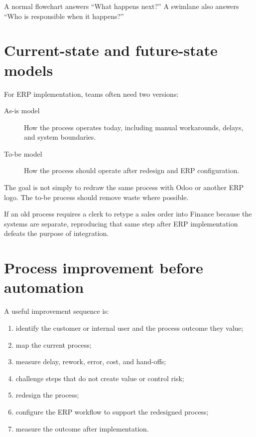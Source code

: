A normal flowchart answers ``What happens next?'' A swimlane also answers ``Who is responsible when it happens?''

\section{Current-state and future-state models}

For ERP implementation, teams often need two versions:

\begin{description}
  \item[As-is model] How the process operates today, including manual workarounds, delays, and system boundaries.
  \item[To-be model] How the process should operate after redesign and ERP configuration.
\end{description}

The goal is not simply to redraw the same process with Odoo or another ERP logo. The to-be process should remove waste where possible.

\begin{pitfall}
If an old process requires a clerk to retype a sales order into Finance because the systems are separate, reproducing that same step after ERP implementation defeats the purpose of integration.
\end{pitfall}

\section{Process improvement before automation}

A useful improvement sequence is:

\begin{enumerate}
  \item identify the customer or internal user and the process outcome they value;
  \item map the current process;
  \item measure delay, rework, error, cost, and hand-offs;
  \item challenge steps that do not create value or control risk;
  \item redesign the process;
  \item configure the ERP workflow to support the redesigned process;
  \item measure the outcome after implementation.
\end{enumerate}

